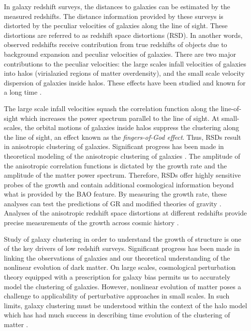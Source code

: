 In galaxy redshift surveys, the distances to galaxies can be estimated by the measured 
redshifts. The distance information provided by these surveys is distorted by the peculiar 
velocities of galaxies along the line of sight. These distortions are referred to as redshift space 
distortions (RSD). In another words, observed redshifts receive contribution from true redshifts of 
objects due to background expansion and peculiar velocities of galaxies. There are two major contributions 
to the peculiar velocities: the large scales infall velocities of galaxies into halos (virialazied regions of matter overdensity), 
and the small scale velocity dispersion of galaxies inside halos. These effects have been studied and known for a long time \citep{jackson1972,kaiser1987}.

The large scale infall velocities squash the correlation function along the line-of-sight 
which increases the power spectrum parallel to the line of sight. At small-scales, the orbital motions 
of galaxies inside halos suppress the clustering along the line of sight, an effect known as the 
\emph{fingers-of-God effect}. Thus, RSDs result in anisotropic clustering of galaxies. Significant progress has 
been made in theoretical modeling of the anisotropic clustering of galaxies \citep{roman2004,percival2009,reid2011}. 
The amplitude of the anisotropic correlation functions is dictated by the growth rate and the amplitude of the 
matter power spectrum. Therefore, RSDs offer highly sensitive probes of the growth and contain additional cosmological information 
beyond what is provided by the BAO feature. By measuring the growth rate, these analyses can 
test the predictions of GR and modified theories of gravity \citep{linder2007,gong2008,Stril2010}. Analyses 
of the anisotropic redshift space distortions at different redshifts provide precise measurements 
of the growth across cosmic history \citep{chuang2013,beutler2014,sanchez2014,gill2017}. 

 
Study of galaxy clustering in order to understand the growth of structure is one of 
the key drivers of low redshift surveys. Significant progress has been made in linking the observations of 
galaxies and our theoretical understanding of the nonlinear evolution of dark matter. 
On large scales, cosmological perturbation theory equipped with a prescription for galaxy 
bias permits us to accurately model the clustering of galaxies. However, nonlinear evolution of matter 
poses a challenge to applicability of perturbative approaches in small scales. In such limits, 
galaxy clustering must be understood within the context of the halo model which has had 
much success in describing time evolution of the clustering of matter \citep{seljak2000,tinker_rsd2007,reid2014}.

